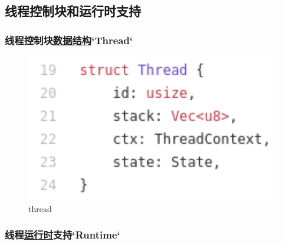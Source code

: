 \subsection{线程控制块和运行时支持}
\begin{frame}[fragile]
    \frametitle{线程控制块\href{https://github.com/cfsamson/example-greenthreads/blob/master/src/main.rs\#L19}{数据结构}`Thread`}
% 
% 
	\begin{figure}
		\centering
		\includegraphics[width=0.5\linewidth]{figs/thread.png}
		\caption{thread}
	\end{figure}


% 
\end{frame}
\begin{frame}[fragile]
    \frametitle{线程\href{https://github.com/cfsamson/example-greenthreads/blob/master/src/main.rs\#L49}{运行时}支持`Runtime`}
% 
% 
\end{frame}
